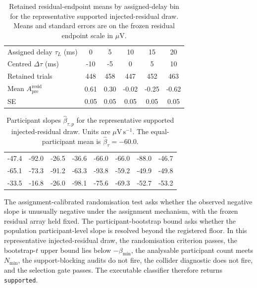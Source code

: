 \begin{table}[t]
\centering
\caption{Retained residual-endpoint means by assigned-delay bin for the representative supported injected-residual draw. Means and standard errors are on the frozen residual endpoint scale in \(\mu\mathrm{V}\).}
\label{tab:si-worked-bins}
\footnotesize
\setlength{\tabcolsep}{4pt}
\begin{tabular}{lccccc}
\toprule
Assigned delay \(\tau_L\) (ms) & 0 & 5 & 10 & 15 & 20 \\
Centred \(\Delta\tau\) (ms) & -10 & -5 & 0 & 5 & 10 \\
\midrule
Retained trials & 448 & 458 & 447 & 452 & 463 \\
Mean \(A^{\mathrm{resid}}_{\mathrm{pre}}\) & 0.61 & 0.30 & -0.02 & -0.25 & -0.62 \\
SE & 0.05 & 0.05 & 0.05 & 0.05 & 0.05 \\
\bottomrule
\end{tabular}
\end{table}

\begin{table}[t]
\centering
\caption{Participant slopes \(\widehat\beta_{\tau,p}\) for the representative supported injected-residual draw. Units are \(\mu\mathrm{V\,s^{-1}}\). The equal-participant mean is \(\widehat\beta_\tau=-60.0\).}
\label{tab:si-worked-slopes}
\footnotesize
\begin{tabular}{rrrrrrrr}
\toprule
-47.4 & -92.0 & -26.5 & -36.6 & -66.0 & -66.0 & -88.0 & -46.7 \\
-65.1 & -73.3 & -91.2 & -63.3 & -93.8 & -59.2 & -49.9 & -49.8 \\
-33.5 & -16.8 & -26.0 & -98.1 & -75.6 & -69.3 & -52.7 & -53.2 \\
\bottomrule
\end{tabular}
\end{table}

The assignment-calibrated randomisation test asks whether the observed negative slope is unusually negative under the assignment mechanism, with the frozen residual array held fixed. The participant-bootstrap bound asks whether the population participant-level slope is resolved beyond the registered floor. In this representative injected-residual draw, the randomisation criterion passes, the bootstrap-\(t\) upper bound lies below \(-\beta_{\min}\), the analysable participant count meets \(N_{\min}\), the support-blocking audits do not fire, the collider diagnostic does not fire, and the selection gate passes. The executable classifier therefore returns \texttt{supported}.

